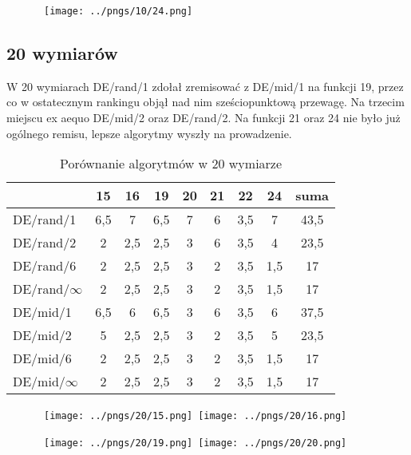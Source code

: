 \begin{figure}[H]
\centering
\mbox{
\texttt{[image: ../pngs/10/24.png]}
}
\end{figure}

\subsection{20 wymiarów}

W 20 wymiarach DE/rand/1 zdołał zremisować z DE/mid/1 na funkcji 19,
przez co w ostatecznym rankingu objął nad nim sześciopunktową przewagę.
Na trzecim miejscu ex aequo DE/mid/2 oraz DE/rand/2. Na funkcji 21 oraz 24 
nie było już ogólnego remisu, lepsze algorytmy wyszły na prowadzenie.

\begin{table}[H]
\centering
\begin{tabular}{ l | c | c | c | c | c | c | c | c}
                 & 15  & 16  & 19  & 20  & 21  & 22  & 24  & suma \\ \hline
DE/rand/1        & 6,5 & 7   & 6,5 & 7   & 6   & 3,5 & 7   & 43,5 \\ 
DE/rand/2        & 2   & 2,5 & 2,5 & 3   & 6   & 3,5 & 4   & 23,5 \\ 
DE/rand/6        & 2   & 2,5 & 2,5 & 3   & 2   & 3,5 & 1,5 & 17   \\ 
DE/rand/$\infty$ & 2   & 2,5 & 2,5 & 3   & 2   & 3,5 & 1,5 & 17   \\ 
DE/mid/1         & 6,5 & 6   & 6,5 & 3   & 6   & 3,5 & 6   & 37,5 \\
DE/mid/2         & 5   & 2,5 & 2,5 & 3   & 2   & 3,5 & 5   & 23,5 \\
DE/mid/6         & 2   & 2,5 & 2,5 & 3   & 2   & 3,5 & 1,5 & 17   \\ 
DE/mid/$\infty$  & 2   & 2,5 & 2,5 & 3   & 2   & 3,5 & 1,5 & 17   \\
\end{tabular}
\caption{Porównanie algorytmów w 20 wymiarze}
\label{table:20d}
\end{table}

\begin{figure}[H]
\centering
\mbox{
\texttt{[image: ../pngs/20/15.png]} \quad
\texttt{[image: ../pngs/20/16.png]} 
}
\end{figure}

\begin{figure}[H]
\centering
\mbox{
\texttt{[image: ../pngs/20/19.png]} \quad
\texttt{[image: ../pngs/20/20.png]} 
}
\end{figure}


